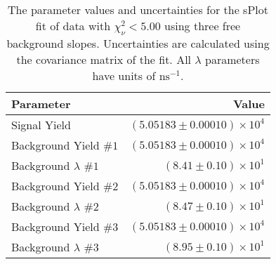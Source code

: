 
\begin{table}[h]
    \begin{center}
        \begin{tabular}{lr}\toprule
            Parameter & Value \\\midrule
            Signal Yield & $(5.05183 \pm 0.00010) \times 10^{4}$ \\
            Background Yield $\#1$ & $(5.05183 \pm 0.00010) \times 10^{4}$ \\
            Background $\lambda$ $\#1$ & $(8.41 \pm 0.10) \times 10^{1}$ \\
            Background Yield $\#2$ & $(5.05183 \pm 0.00010) \times 10^{4}$ \\
            Background $\lambda$ $\#2$ & $(8.47 \pm 0.10) \times 10^{1}$ \\
            Background Yield $\#3$ & $(5.05183 \pm 0.00010) \times 10^{4}$ \\
            Background $\lambda$ $\#3$ & $(8.95 \pm 0.10) \times 10^{1}$ \\\bottomrule
        \end{tabular}
        \caption{The parameter values and uncertainties for the sPlot fit of data with $\chi^2_\nu < 5.00$ using three free background slopes. Uncertainties are calculated using the covariance matrix of the fit. All $\lambda$ parameters have units of $\si{\nano\second}^{-1}$.}
    \end{center}
\end{table}
